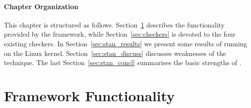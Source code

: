 \paragraph{Chapter Organization}
This chapter is structured as follows. Section~\ref{sec:stan_framework}
describes the functionality provided by the framework, while
Section~\ref{sec:checkers} is devoted to the four existing checkers.  In
Section~\ref{sec:stan_results} we present some results of running \stan on the
Linux kernel.  Section~\ref{sec:stan_discuss} discusses weaknesses of the
technique.  The last Section~\ref{sec:stan_concl} summarises the basic
strengths of \stan.


\section{Framework Functionality}\label{sec:stan_framework}

